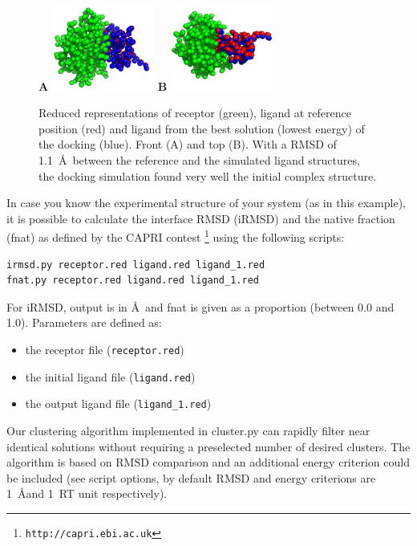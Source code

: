 \documentclass[12pt,a4paper]{article}
\begin{document}
\begin{figure}[htbp]
\center
{\textbf A}
\includegraphics*[width=0.30\textwidth]{img/1CGI_dock1_front.png}
\hspace*{2cm}
{\textbf B}
\includegraphics*[width=0.30\textwidth]{img/1CGI_dock1_top.png}
\caption{Reduced representations of receptor (green), ligand at reference position (red)
and ligand from the best solution (lowest energy) of the docking (blue). Front (A) and top (B).
With a RMSD of 1.1~\AA\ between the reference and the simulated ligand structures, the docking 
simulation found very well the initial complex structure.}
\end{figure}


In case you know the experimental structure of your system (as in this example), it is possible to calculate the
interface RMSD (iRMSD) and the native fraction (fnat) as defined by the CAPRI contest \footnote{\tt http://capri.ebi.ac.uk}
using the following scripts:

\begin{verbatim}
irmsd.py receptor.red ligand.red ligand_1.red
fnat.py receptor.red ligand.red ligand_1.red
\end{verbatim}

For iRMSD, output is in \AA\ and fnat is given as a proportion (between 0.0 and 1.0). Parameters are defined as:
\begin{itemize}
\item the receptor file ({\tt receptor.red})
\item the initial ligand file ({\tt ligand.red})
\item the output ligand file ({\tt ligand\_1.red})
\end{itemize}

Our clustering algorithm implemented in cluster.py can rapidly filter near identical solutions 
without requiring a preselected number of desired clusters.
The algorithm is based on RMSD comparison and an additional energy criterion could be included 
(see script options, by default RMSD and energy criterions are 1~\AA and 1~RT unit respectively).
\end{document}
